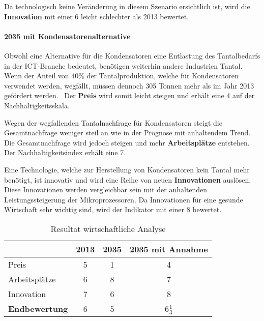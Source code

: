 Da technologisch keine Veränderung in diesem Szenario ersichtlich ist, wird die \textbf{Innovation} mit einer 6 leicht schlechter als 2013 bewertet.

\paragraph{2035 mit Kondensatorenalternative}
Obwohl eine Alternative für die Kondensatoren eine Entlastung des Tantalbedarfs in der ICT-Branche bedeutet, benötigen weiterhin andere Industrien Tantal. Wenn der Anteil von 40\% der Tantalproduktion, welche für Kondensatoren verwendet werden, wegfällt, müssen dennoch 305 Tonnen mehr als im Jahr 2013 gefördert werden.~\cite{tantal_price2} Der \textbf{Preis} wird somit leicht steigen und erhält eine 4 auf der Nachhaltigkeitsskala.

Wegen der wegfallenden Tantalnachfrage für Kondensatoren steigt die Gesamtnachfrage weniger steil an wie in der Prognose mit anhaltendem Trend. Die Gesamtnachfrage wird jedoch steigen und mehr \textbf{Arbeitsplätze} entstehen. Der Nachhaltigkeitsindex erhält eine 7.

Eine Technologie, welche zur Herstellung von Kondensatoren kein Tantal mehr benötigt, ist innovativ und wird eine Reihe von neuen \textbf{Innovationen} auslösen. Diese Innovationen werden vergleichbar sein mit der anhaltenden Leistungssteigerung der Mikroprozessoren. Da Innovationen für eine gesunde Wirtschaft sehr wichtig sind, wird der Indikator mit einer 8 bewertet.

\begin{table}[h]
  \centering
  \begin{tabular}{l|ccc}            & \textbf{2013} & \textbf{2035} & \textbf{2035 mit Annahme}
    \\ \hline Preis                 & 5             & 1             & 4
    \\ Arbeitsplätze                & 6             & 8             & 7
    \\ Innovation                   & 7             & 6             & 8
    \\ \hline \textbf{Endbewertung} & 6             & 5             & 6\(\frac{1}{3}\)
  \end{tabular}
  \caption{Resultat wirtschaftliche Analyse}
\end{table}

